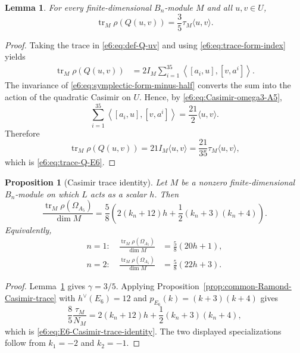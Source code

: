 \documentclass[11pt,reqno]{amsart}
\newtheorem{lemma}[theorem]{Lemma}
\newtheorem{proposition}[theorem]{Proposition}
\theoremstyle{definition}
\theoremstyle{remark}
\begin{document}
\begin{lemma}\label{e6:lem:trace-Q-E6}
For every finite-dimensional $B_n$-module $M$ and all $u,v\in U$,
\begin{equation}\label{e6:eq:trace-Q-E6}
  \operatorname{tr}_M\rho(Q(u,v))
  =\frac35\tau_M\langle u,v\rangle.
\end{equation}
\end{lemma}

\begin{proof}
Taking the trace in \eqref{e6:eq:def-Q-uv} and using
\eqref{e6:eq:trace-form-index} yields
\begin{align*}
  \operatorname{tr}_M\rho(Q(u,v))
  &=2I_M\sum_{i=1}^{35}
    \left\langle[a_i,u],[v,a^i]\right\rangle.
\end{align*}
The invariance of \eqref{e6:eq:symplectic-form-minus-half} converts the sum into
the action of the quadratic Casimir on $U$.  Hence, by
\eqref{e6:eq:Casimir-omega3-A5},
\[
  \sum_{i=1}^{35}
  \left\langle[a_i,u],[v,a^i]\right\rangle
  =\frac{21}{2}\langle u,v\rangle.
\]
Therefore
\[
  \operatorname{tr}_M\rho(Q(u,v))
  =21I_M\langle u,v\rangle
  =\frac{21}{35}\tau_M\langle u,v\rangle,
\]
which is \eqref{e6:eq:trace-Q-E6}.
\end{proof}

\begin{proposition}[Casimir trace identity]\label{e6:prop:E6-Casimir-trace-identity}
Let $M$ be a nonzero finite-dimensional $B_n$-module on which $L$ acts as a
scalar $h$.  Then
\begin{equation}\label{e6:eq:E6-Casimir-trace-identity}
  \frac{\operatorname{tr}_M\rho(\Omega_{A_5})}{\dim M}
  =\frac58
   \left(
     2(k_n+12)h
     +\frac12(k_n+3)(k_n+4)
   \right).
\end{equation}
Equivalently,
\begin{align*}
  n=1:\quad
  \frac{\operatorname{tr}_M\rho(\Omega_{A_5})}{\dim M}
  &=\frac58(20h+1),\\
  n=2:\quad
  \frac{\operatorname{tr}_M\rho(\Omega_{A_5})}{\dim M}
  &=\frac58(22h+3).
\end{align*}
\end{proposition}

\begin{proof}
Lemma~\ref{e6:lem:trace-Q-E6} gives $\gamma=3/5$.  Applying
Proposition~\ref{prop:common-Ramond-Casimir-trace} with
$h^\vee(E_6)=12$ and $p_{E_6}(k)=(k+3)(k+4)$ gives
\[
 \frac85\frac{\tau_M}{N_M}
 =2(k_n+12)h+\frac12(k_n+3)(k_n+4),
\]
which is \eqref{e6:eq:E6-Casimir-trace-identity}.  The two displayed
specializations follow from $k_1=-2$ and $k_2=-1$.
\end{proof}
\end{document}

